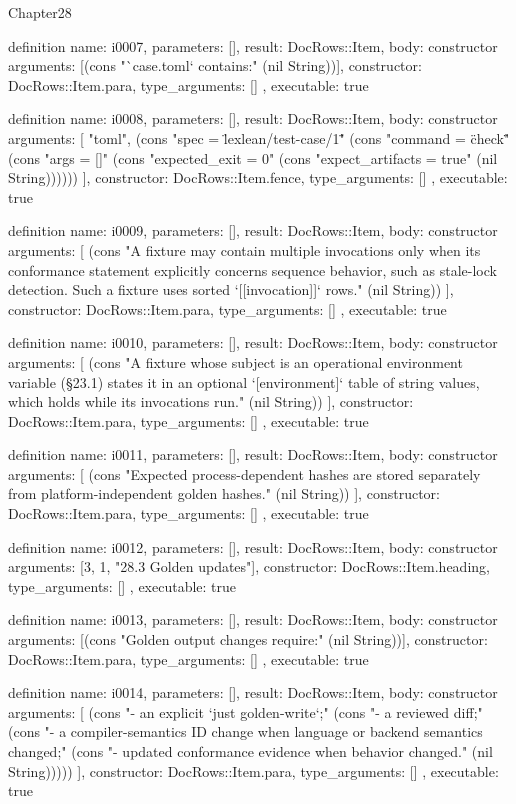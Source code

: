 \begin{lexlean}{Chapter28}
\begin{semanticmodule}
definition{
  name: i0007,
  parameters: [],
  result: DocRows::Item,
  body: constructor{
    arguments: [(cons "`case.toml` contains:" (nil String))],
    constructor: DocRows::Item.para,
    type_arguments: []
  },
  executable: true
}

definition{
  name: i0008,
  parameters: [],
  result: DocRows::Item,
  body: constructor{
    arguments: [
      "toml",
      (cons "spec = \"lexlean/test-case/1\"" (cons "command = \"check\"" (cons "args = []" (cons "expected_exit = 0" (cons "expect_artifacts = true" (nil String))))))
    ],
    constructor: DocRows::Item.fence,
    type_arguments: []
  },
  executable: true
}

definition{
  name: i0009,
  parameters: [],
  result: DocRows::Item,
  body: constructor{
    arguments: [
      (cons "A fixture may contain multiple invocations only when its conformance statement explicitly concerns sequence behavior, such as stale-lock detection. Such a fixture uses sorted `[[invocation]]` rows." (nil String))
    ],
    constructor: DocRows::Item.para,
    type_arguments: []
  },
  executable: true
}

definition{
  name: i0010,
  parameters: [],
  result: DocRows::Item,
  body: constructor{
    arguments: [
      (cons "A fixture whose subject is an operational environment variable (§23.1) states it in an optional `[environment]` table of string values, which holds while its invocations run." (nil String))
    ],
    constructor: DocRows::Item.para,
    type_arguments: []
  },
  executable: true
}

definition{
  name: i0011,
  parameters: [],
  result: DocRows::Item,
  body: constructor{
    arguments: [
      (cons "Expected process-dependent hashes are stored separately from platform-independent golden hashes." (nil String))
    ],
    constructor: DocRows::Item.para,
    type_arguments: []
  },
  executable: true
}

definition{
  name: i0012,
  parameters: [],
  result: DocRows::Item,
  body: constructor{
    arguments: [3, 1, "28.3 Golden updates"],
    constructor: DocRows::Item.heading,
    type_arguments: []
  },
  executable: true
}

definition{
  name: i0013,
  parameters: [],
  result: DocRows::Item,
  body: constructor{
    arguments: [(cons "Golden output changes require:" (nil String))],
    constructor: DocRows::Item.para,
    type_arguments: []
  },
  executable: true
}

definition{
  name: i0014,
  parameters: [],
  result: DocRows::Item,
  body: constructor{
    arguments: [
      (cons "- an explicit `just golden-write`;" (cons "- a reviewed diff;" (cons "- a compiler-semantics ID change when language or backend semantics changed;" (cons "- updated conformance evidence when behavior changed." (nil String)))))
    ],
    constructor: DocRows::Item.para,
    type_arguments: []
  },
  executable: true
}


\end{semanticmodule}
\end{lexlean}
